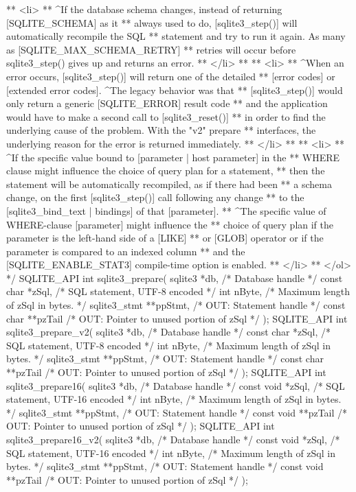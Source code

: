 \begin{Codex}[label=sqlite3.h,numbers=left]
{** <li>
** ^If the database schema changes, instead of returning [SQLITE_SCHEMA] as it
** always used to do, [sqlite3_step()] will automatically recompile the SQL
** statement and try to run it again. As many as [SQLITE_MAX_SCHEMA_RETRY]
** retries will occur before sqlite3_step() gives up and returns an error.
** </li>
**
** <li>
** ^When an error occurs, [sqlite3_step()] will return one of the detailed
** [error codes] or [extended error codes].  ^The legacy behavior was that
** [sqlite3_step()] would only return a generic [SQLITE_ERROR] result code
** and the application would have to make a second call to [sqlite3_reset()]
** in order to find the underlying cause of the problem. With the "v2" prepare
** interfaces, the underlying reason for the error is returned immediately.
** </li>
**
** <li>
** ^If the specific value bound to [parameter | host parameter] in the 
** WHERE clause might influence the choice of query plan for a statement,
** then the statement will be automatically recompiled, as if there had been 
** a schema change, on the first  [sqlite3_step()] call following any change
** to the [sqlite3_bind_text | bindings] of that [parameter]. 
** ^The specific value of WHERE-clause [parameter] might influence the 
** choice of query plan if the parameter is the left-hand side of a [LIKE]
** or [GLOB] operator or if the parameter is compared to an indexed column
** and the [SQLITE_ENABLE_STAT3] compile-time option is enabled.
** </li>
** </ol>
*/
SQLITE_API int sqlite3_prepare(
  sqlite3 *db,            /* Database handle */
  const char *zSql,       /* SQL statement, UTF-8 encoded */
  int nByte,              /* Maximum length of zSql in bytes. */
  sqlite3_stmt **ppStmt,  /* OUT: Statement handle */
  const char **pzTail     /* OUT: Pointer to unused portion of zSql */
);
SQLITE_API int sqlite3_prepare_v2(
  sqlite3 *db,            /* Database handle */
  const char *zSql,       /* SQL statement, UTF-8 encoded */
  int nByte,              /* Maximum length of zSql in bytes. */
  sqlite3_stmt **ppStmt,  /* OUT: Statement handle */
  const char **pzTail     /* OUT: Pointer to unused portion of zSql */
);
SQLITE_API int sqlite3_prepare16(
  sqlite3 *db,            /* Database handle */
  const void *zSql,       /* SQL statement, UTF-16 encoded */
  int nByte,              /* Maximum length of zSql in bytes. */
  sqlite3_stmt **ppStmt,  /* OUT: Statement handle */
  const void **pzTail     /* OUT: Pointer to unused portion of zSql */
);
SQLITE_API int sqlite3_prepare16_v2(
  sqlite3 *db,            /* Database handle */
  const void *zSql,       /* SQL statement, UTF-16 encoded */
  int nByte,              /* Maximum length of zSql in bytes. */
  sqlite3_stmt **ppStmt,  /* OUT: Statement handle */
  const void **pzTail     /* OUT: Pointer to unused portion of zSql */
);

}
\end{Codex}
